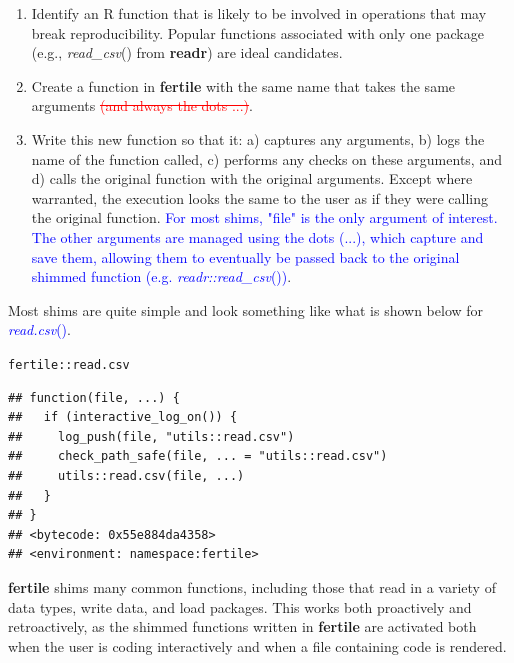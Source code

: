 \documentclass[APA,LATO1COL]{WileyNJD-v2}\usepackage[]{graphicx}\usepackage[]{color}
\makeatletter
\newcommand{\hlopt}[1]{\textcolor[rgb]{0,0,0}{#1}}%
\newcommand{\hlstd}[1]{\textcolor[rgb]{0.345,0.345,0.345}{#1}}%
\newenvironment{kframe}{%
 \def\at@end@of@kframe{}%
 \ifinner\ifhmode%
  \def\at@end@of@kframe{\end{minipage}}%
  \begin{minipage}{\columnwidth}%
 \fi\fi%
 \def\FrameCommand##1{\hskip\@totalleftmargin \hskip-\fboxsep
 \colorbox{shadecolor}{##1}\hskip-\fboxsep
     \hskip-\linewidth \hskip-\@totalleftmargin \hskip\columnwidth}%
 \MakeFramed {\advance\hsize-\width
   \@totalleftmargin\z@ \linewidth\hsize
   \@setminipage}}%
 {\par\unskip\endMakeFramed%
 \at@end@of@kframe}
\newenvironment{knitrout}{}{} %
\newcommand{\R}{\textsf{R}\xspace}
\newcommand{\pkg}[1]{\textbf{#1}}
\newcommand{\func}[1]{\textit{#1}()}
\makeatother
\begin{document}
\begin{enumerate}[noitemsep]
\item Identify an \R function that is likely to be involved in operations that may break reproducibility. Popular functions associated with only one package (e.g., \func{read\_csv} from \pkg{readr}) are ideal candidates.
\item Create a function in \pkg{fertile} with the same name that takes the same arguments \textcolor{red}{\st{(and always the dots ...)}}.
\item Write this new function so that it: a) captures any arguments, b) logs the name of the function called, c) performs any checks on these arguments, and d) calls the original function with the original arguments. Except where warranted, the execution looks the same to the user as if they were calling the original function. \textcolor{blue}{For most shims, "file" is the only argument of interest. The other arguments are managed using the dots (...), which capture and save them, allowing them to eventually be passed back to the original shimmed function (e.g. \func{readr::read\_csv})}.

\end{enumerate}
Most shims are quite simple and look something like what is shown below for \textcolor{blue}{\func{read.csv}}. 

\begin{knitrout}
\color{fgcolor}\begin{kframe}
\begin{alltt}
\hlstd{fertile}\hlopt{::}\hlstd{read.csv}
\end{alltt}
\begin{verbatim}
## function(file, ...) {
##   if (interactive_log_on()) {
##     log_push(file, "utils::read.csv")
##     check_path_safe(file, ... = "utils::read.csv")
##     utils::read.csv(file, ...)
##   }
## }
## <bytecode: 0x55e884da4358>
## <environment: namespace:fertile>
\end{verbatim}
\end{kframe}
\end{knitrout}

\pkg{fertile} shims many common functions, including those that read in a variety of data types, write data, and load packages. This works both proactively and retroactively, as the shimmed functions written in \pkg{fertile} are activated both when the user is coding interactively and when a file containing code is rendered.
\end{document}
